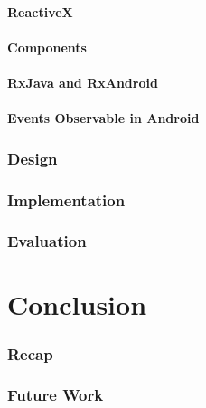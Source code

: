 \documentclass[11pt,a4paper,notitlepage]{article}
\begin{document}
\subsection{ReactiveX}

\subsection{Components}

\subsection{RxJava and RxAndroid}

\subsection{Events Observable in Android}



\section{Design}



\section{Implementation}



\section{Evaluation}



\part{Conclusion}

\section{Recap}

\section{Future Work}




 
\end{document}
